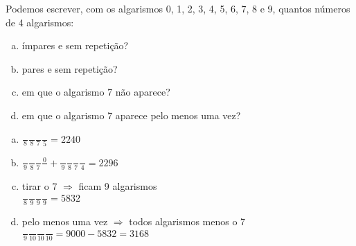 \begin{ex}
 Podemos escrever, com os algarismos 0, 1, 2, 3, 4, 5, 6, 7, 8 e 9, quantos números de 4 algarismos:
    \begin{enumerate}[(a)]
    \item ímpares e sem repetição?
    \item pares e sem repetição?
    \item em que o algarismo 7 não aparece?
    \item em que o algarismo 7 aparece pelo menos uma vez?
    \end{enumerate}
  \begin{sol}
      \phantom{A} 
   \begin{enumerate} [(a)]
       \item $\frac{\phantom{A}}{8}\frac{\phantom{A}}{8}\frac{\phantom{A}}{7}\frac{\phantom{A}}{5}= 2240$
       \item $\frac{\phantom{A}}{9}\frac{\phantom{A}}{8}\frac{\phantom{A}}{7}\frac{0}{\phantom{A}}+\frac{\phantom{A}}{9}\frac{\phantom{A}}{8}\frac{\phantom{A}}{7}\frac{\phantom{A}}{4}=2296$
       \item tirar o 7 $\Longrightarrow$ ficam 9 algarismos\\ $\frac{\phantom{A}}{8}\frac{\phantom{A}}{9}\frac{\phantom{A}}{9}\frac{\phantom{A}}{9}= 5832$
       \item pelo menos uma vez $\Longrightarrow$ todos algarismos menos o 7\\
       $\frac{\phantom{A}}{9}\frac{\phantom{A}}{10}\frac{\phantom{A}}{10}\frac{\phantom{A}}{10}= 9000 - 5832=3168$
   \end{enumerate}
  \end{sol}
\end{ex}